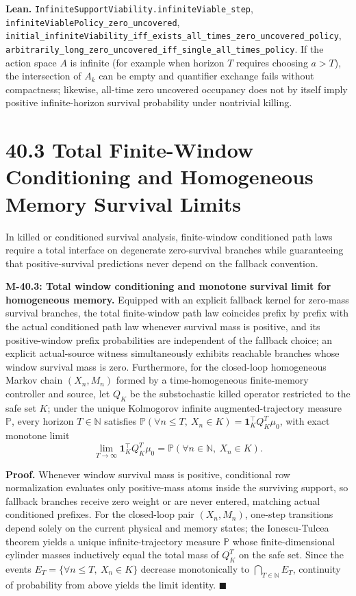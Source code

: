 \documentclass[
  english,
  11pt,
  oneside]{book}
\begin{document}
\textbf{Lean.} \nolinkurl{InfiniteSupportViability.infiniteViable_step}, \nolinkurl{infiniteViablePolicy_zero_uncovered}, \nolinkurl{initial_infiniteViability_iff_exists_all_times_zero_uncovered_policy}, \nolinkurl{arbitrarily_long_zero_uncovered_iff_single_all_times_policy}. If the action space \(A\) is infinite (for example when horizon \(T\) requires choosing \(a>T\)), the intersection of \(A_k\) can be empty and quantifier exchange fails without compactness; likewise, all-time zero uncovered occupancy does not by itself imply positive infinite-horizon survival probability under nontrivial killing.

\section{40.3 Total Finite-Window Conditioning and Homogeneous Memory Survival Limits}\label{total-finite-window-conditioning-and-homogeneous-memory-survival-limits}

In killed or conditioned survival analysis, finite-window conditioned path laws require a total interface on degenerate zero-survival branches while guaranteeing that positive-survival predictions never depend on the fallback convention.

\hypertarget{m-40-3}{}\label{m-40-3}

\textbf{M-40.3: Total window conditioning and monotone survival limit for homogeneous memory.} Equipped with an explicit fallback kernel for zero-mass survival branches, the total finite-window path law coincides prefix by prefix with the actual conditioned path law whenever survival mass is positive, and its positive-window prefix probabilities are independent of the fallback choice; an explicit actual-source witness simultaneously exhibits reachable branches whose window survival mass is zero. Furthermore, for the closed-loop homogeneous Markov chain \((X_n,M_n)\) formed by a time-homogeneous finite-memory controller and source, let \(Q_K\) be the substochastic killed operator restricted to the safe set \(K\); under the unique Kolmogorov infinite augmented-trajectory measure \(\mathbb P\), every horizon \(T\in\mathbb N\) satisfies \(\mathbb P(\forall n\le T,\ X_n\in K)=\mathbf 1_K^\top Q_K^T\mu_0\), with exact monotone limit \[\lim_{T\to\infty}\mathbf 1_K^\top Q_K^T\mu_0=\mathbb P(\forall n\in\mathbb N,\ X_n\in K).\]

\textbf{Proof.} Whenever window survival mass is positive, conditional row normalization evaluates only positive-mass atoms inside the surviving support, so fallback branches receive zero weight or are never entered, matching actual conditioned prefixes. For the closed-loop pair \((X_n,M_n)\), one-step transitions depend solely on the current physical and memory states; the Ionescu-Tulcea theorem yields a unique infinite-trajectory measure \(\mathbb P\) whose finite-dimensional cylinder masses inductively equal the total mass of \(Q_K^T\) on the safe set. Since the events \(E_T=\{\forall n\le T,\ X_n\in K\}\) decrease monotonically to \(\bigcap_{T\in\mathbb N}E_T\), continuity of probability from above yields the limit identity. \(\blacksquare\)
\end{document}

